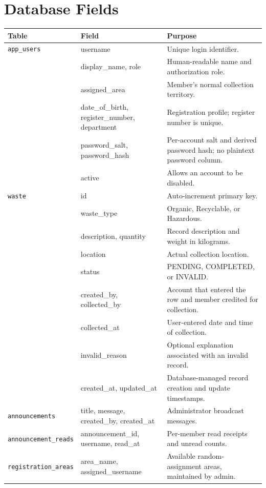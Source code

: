 \documentclass[12pt,a4paper]{report}
\begin{document}
\section{Database Fields}
\begin{longtable}{p{}p{}p{}}
\toprule
\textbf{Table} & \textbf{Field} & \textbf{Purpose}\\
\midrule
\endhead
\texttt{app\_users} & username & Unique login identifier.\\
 & display\_name, role & Human-readable name and authorization role.\\
 & assigned\_area & Member's normal collection territory.\\
 & date\_of\_birth, register\_number, department & Registration profile; register number is unique.\\
 & password\_salt, password\_hash & Per-account salt and derived password hash; no plaintext password column.\\
 & active & Allows an account to be disabled.\\
\texttt{waste} & id & Auto-increment primary key.\\
 & waste\_type & Organic, Recyclable, or Hazardous.\\
 & description, quantity & Record description and weight in kilograms.\\
 & location & Actual collection location.\\
 & status & PENDING, COMPLETED, or INVALID.\\
 & created\_by, collected\_by & Account that entered the row and member credited for collection.\\
 & collected\_at & User-entered date and time of collection.\\
 & invalid\_reason & Optional explanation associated with an invalid record.\\
 & created\_at, updated\_at & Database-managed record creation and update timestamps.\\
\texttt{announcements} & title, message, created\_by, created\_at & Administrator broadcast messages.\\
\texttt{announcement\_reads} & announcement\_id, username, read\_at & Per-member read receipts and unread counts.\\
\texttt{registration\_areas} & area\_name, assigned\_username & Available random-assignment areas, maintained by admin.\\
\bottomrule
\end{longtable}
\end{document}
